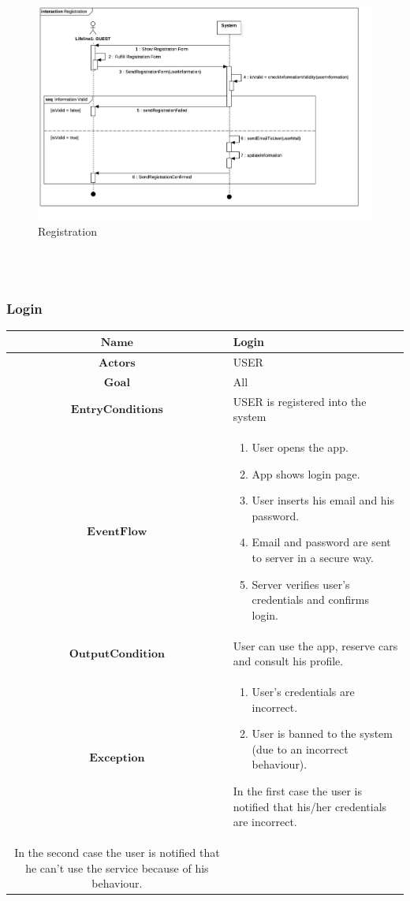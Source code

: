 \begin{center}
\begin{figure}[H]
\includegraphics[scale=0.3]{UML/png/Collaboration6__Interaction1__Registration_8}

\caption{Registration}

\end{figure}
\\
\\
\par\end{center}

\subsubsection{Login}

\begin{tabular}{|c|>{\raggedright}p{10cm}|}
\hline 
$\boldsymbol{\mathbf{Name}}$ & Login\tabularnewline
\hline 
$\mathbf{Actors}$ & USER\tabularnewline
\hline 
$\mathbf{Goal}$ & All\tabularnewline
\hline 
$\mathbf{EntryConditions}$ & USER is registered into the system\tabularnewline
\hline 
$\mathbf{EventFlow}$ & \begin{enumerate}
\item User opens the app.
\item App shows login page.
\item User inserts his email and his password.
\item Email and password are sent to server in a secure way.
\item Server verifies user's credentials and confirms login.
\end{enumerate}
\tabularnewline
\hline 
$\mathbf{OutputCondition}$ & User can use the app, reserve cars and consult his profile.\tabularnewline
\hline 
$\mathbf{Exception}$ & \begin{enumerate}
\item User's credentials are incorrect.
\item User is banned to the system (due to an incorrect behaviour).
\end{enumerate}
In the first case the user is notified that his/her credentials are
incorrect. \\
In the second case the user is notified that he can't use the service
because of his behaviour. \tabularnewline
\hline 
\end{tabular}\\
\\

